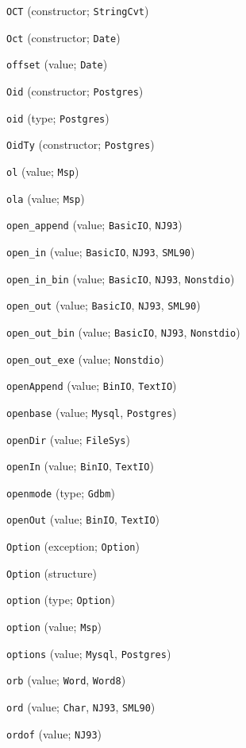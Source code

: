 \begin{description}
\item[] \verb"OCT" (constructor; \verb"StringCvt")
\item[] \verb"Oct" (constructor; \verb"Date")
\item[] \verb"offset" (value; \verb"Date")
\item[] \verb"Oid" (constructor; \verb"Postgres")
\item[] \verb"oid" (type; \verb"Postgres")
\item[] \verb"OidTy" (constructor; \verb"Postgres")
\item[] \verb"ol" (value; \verb"Msp")
\item[] \verb"ola" (value; \verb"Msp")
\item[] \verb"open_append" (value; \verb"BasicIO", \verb"NJ93")
\item[] \verb"open_in" (value; \verb"BasicIO", \verb"NJ93", \verb"SML90")
\item[] \verb"open_in_bin" (value; \verb"BasicIO", \verb"NJ93", \verb"Nonstdio")
\item[] \verb"open_out" (value; \verb"BasicIO", \verb"NJ93", \verb"SML90")
\item[] \verb"open_out_bin" (value; \verb"BasicIO", \verb"NJ93", \verb"Nonstdio")
\item[] \verb"open_out_exe" (value; \verb"Nonstdio")
\item[] \verb"openAppend" (value; \verb"BinIO", \verb"TextIO")
\item[] \verb"openbase" (value; \verb"Mysql", \verb"Postgres")
\item[] \verb"openDir" (value; \verb"FileSys")
\item[] \verb"openIn" (value; \verb"BinIO", \verb"TextIO")
\item[] \verb"openmode" (type; \verb"Gdbm")
\item[] \verb"openOut" (value; \verb"BinIO", \verb"TextIO")
\item[] \verb"Option" (exception; \verb"Option")
\item[] \verb"Option" (structure)
\item[] \verb"option" (type; \verb"Option")
\item[] \verb"option" (value; \verb"Msp")
\item[] \verb"options" (value; \verb"Mysql", \verb"Postgres")
\item[] \verb"orb" (value; \verb"Word", \verb"Word8")
\item[] \verb"ord" (value; \verb"Char", \verb"NJ93", \verb"SML90")
\item[] \verb"ordof" (value; \verb"NJ93")

\end{description}
